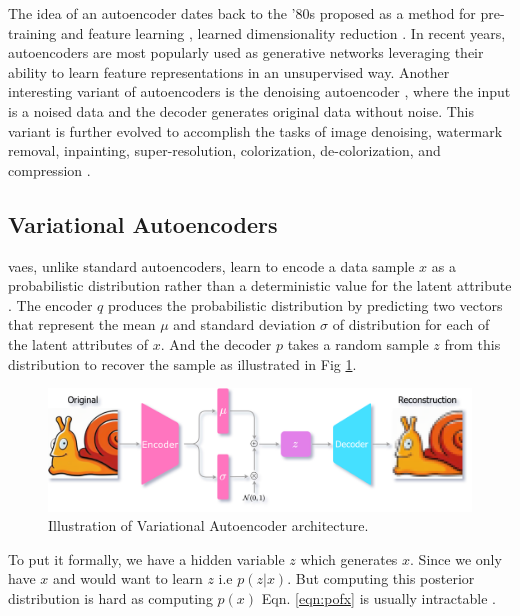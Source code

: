 The idea of an autoencoder dates back to the '80s proposed as a method for pre-training and feature learning \cite{ballard1987modular, rumelhart1985learning}, learned dimensionality reduction \cite{hinton_dimentionality}. In recent years, autoencoders are most popularly used as generative networks leveraging their ability to learn feature representations in an unsupervised way. Another interesting variant of autoencoders is the denoising autoencoder \cite{vincent2008extracting}, where the input is a noised data and the decoder generates original data without noise. This variant is further evolved to accomplish the tasks of image denoising, watermark removal, inpainting, super-resolution, colorization, de-colorization, and compression \cite{zhang2016colorful, imagedenoisingpaper,deepimageprior}. 

\subsection{Variational Autoencoders}
\label{subsec:vae}
\acp{vae}, unlike standard autoencoders, learn to encode a data sample $x$ as a probabilistic distribution rather than a deterministic value for the latent attribute \cite{jeremy_jordan_2018}. The encoder $q$ produces the probabilistic distribution by predicting two vectors that represent the mean $\mu$ and standard deviation $\sigma$ of distribution for each of the latent attributes of $x$. And the decoder $p$ takes a random sample $z$ from this distribution to recover the sample as illustrated in Fig \ref{fig:vae_arch}.

\begin{figure}[h]
    \centering
    \includegraphics[scale=0.2]{figures/arch/vae_arch.png}
    \caption{Illustration of Variational Autoencoder architecture.}
    \label{fig:vae_arch}
\end{figure}

To put it formally, we have a hidden variable $z$ which generates $x$. Since we only have $x$ and would want to learn $z$ i.e $p(z | x)$. But computing this posterior distribution is hard as computing $p(x)$ Eqn. \ref{eqn:pofx} is usually intractable \cite{kingma2013autoencoding}.

